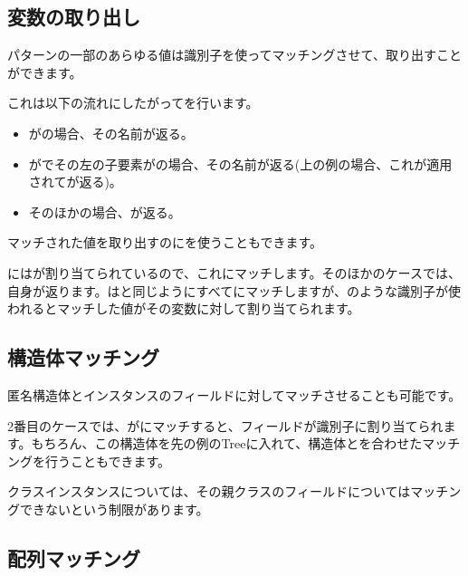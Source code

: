 \subsection{変数の取り出し}
\label{lf-pattern-matching-variable-capture}

パターンの一部のあらゆる値は識別子を使ってマッチングさせて、取り出すことができます。


これは以下の流れにしたがってを行います。

\begin{itemize}
	\item {}がの場合、その名前が返る。
	\item {}がでその左の子要素がの場合、その名前が返る(上の例の場合、これが適用されてが返る)。
	\item そのほかの場合、が返る。
\end{itemize}

マッチされた値を取り出すのに\expr{=}を使うこともできます。


にはが割り当てられているので、これにマッチします。そのほかのケースでは、自身が返ります。はと同じようにすべてにマッチしますが、のような識別子が使われるとマッチした値がその変数に対して割り当てられます。

\subsection{構造体マッチング}
\label{lf-pattern-matching-structure}

匿名構造体とインスタンスのフィールドに対してマッチさせることも可能です。


2番目のケースでは、がにマッチすると、フィールドが識別子に割り当てられます。もちろん、この構造体を先の例のTreeに入れて、構造体とを合わせたマッチングを行うこともできます。

クラスインスタンスについては、その親クラスのフィールドについてはマッチングできないという制限があります。

\subsection{配列マッチング}
\label{lf-pattern-matching-array}

